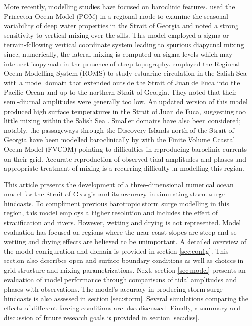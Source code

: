 \documentclass{tATO2e}
\begin{document}
More recently, modelling studies have focused on baroclinic features. \citet{masson2004modelling} used the Princeton Ocean Model (POM) in a regional mode to examine the seasonal variability of deep water properties in the Strait of Georgia and noted a strong sensitivity to vertical mixing over the sills. This model employed a sigma or terrain-following vertical coordinate system leading to spurious diapycnal mixing since, numerically, the lateral mixing is computed on sigma levels which may intersect isopycnals in the presence of steep topography. 
\citet{sutherland2011model} employed the Regional Ocean Modelling System (ROMS) to study estuarine circulation in the Salish Sea with a model domain that extended outside the Strait of Juan de Fuca into the Pacific Ocean and up to the northern Strait of Georgia. They noted that their semi-diurnal amplitudes were generally too low. An updated version of this model produced high surface temperatures in the Strait of Juan de Fuca, suggesting too little mixing within the Salish Sea \citep{giddings2014hindcasts}. Smaller domains have also been considered; notably, the passageways through the Discovery Islands north of the Strait of Georgia have been modelled baroclinically by \citet{foreman2012circulation} with the Finite Volume Coastal Ocean Model (FVCOM) pointing to difficulties in reproducing baroclinic currents on their grid.  Accurate reproduction of observed tidal amplitudes and phases and appropriate treatment of mixing is a recurring difficulty in modelling this region.

This article presents the development of a three-dimensional numerical ocean model for the Strait of Georgia and its accuracy in simulating storm surge hindcasts. To compliment previous barotropic storm surge modelling in this region, this model employs a higher resolution and includes the effect of stratification and rivers. However, wetting and drying is not represented. Model evaluation has focused on regions where the near-coast slopes are steep and so wetting and drying effects are believed to be unimportant. A detailed overview of the model configuration and domain is provided in section \ref{sec:config}. This section also describes open and surface boundary conditions as well as choices in grid structure and mixing parametrizations. Next, section \ref{sec:model} presents an evaluation of model performance through comparisons of tidal amplitudes and phases with observations. The model's accuracy in producing storm surge hindcasts is also assessed in section \ref{sec:storm}. Several simulations comparing the effects of different forcing conditions are also discussed. Finally, a summary and discussion of future research goals is provided in section \ref{sec:diss}.  
\end{document}
